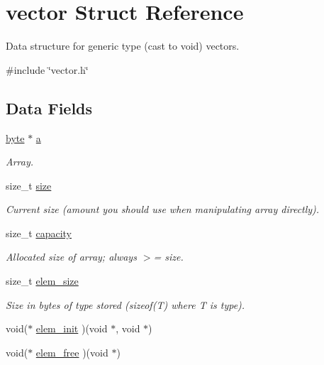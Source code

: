 \hypertarget{structvector}{\section{vector \-Struct \-Reference}
\label{structvector}
}


\-Data structure for generic type (cast to void) vectors.  




{\ttfamily \#include \char`\"{}vector.\-h\char`\"{}}

\subsection*{\-Data \-Fields}
\begin{DoxyCompactItemize}
\item 
\hyperlink{vector_8h_a0c8186d9b9b7880309c27230bbb5e69d}{byte} $\ast$ \hyperlink{structvector_ae086a0bd5a910803add11ed953819018}{a}
\begin{DoxyCompactList}\small\item\em \-Array. \end{DoxyCompactList}\item 
size\-\_\-t \hyperlink{structvector_a4200005b6949608d6a533db1a0d299c8}{size}
\begin{DoxyCompactList}\small\item\em \-Current size (amount you should use when manipulating array directly). \end{DoxyCompactList}\item 
size\-\_\-t \hyperlink{structvector_a59f95fbd95d6f3e84e98a722a66e629a}{capacity}
\begin{DoxyCompactList}\small\item\em \-Allocated size of array; always $>$= size. \end{DoxyCompactList}\item 
size\-\_\-t \hyperlink{structvector_a5c32d3768ff522662c71cb74634bb717}{elem\-\_\-size}
\begin{DoxyCompactList}\small\item\em \-Size in bytes of type stored (sizeof(\-T) where \-T is type). \end{DoxyCompactList}\item 
void($\ast$ \hyperlink{structvector_a9aa1b736be034d1734173299ba7874e2}{elem\-\_\-init} )(void $\ast$, void $\ast$)
\item 
void($\ast$ \hyperlink{structvector_aa707fd886c386fe365b6d6dbadb49733}{elem\-\_\-free} )(void $\ast$)
\end{DoxyCompactItemize}


